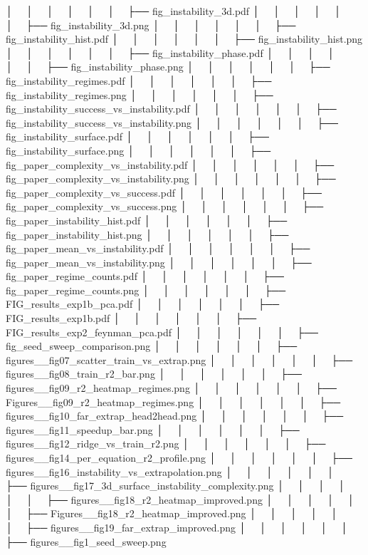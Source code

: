 │   │       │   │   │   │   ├── fig_instability_3d.pdf
│   │       │   │   │   │   ├── fig_instability_3d.png
│   │       │   │   │   │   ├── fig_instability_hist.pdf
│   │       │   │   │   │   ├── fig_instability_hist.png
│   │       │   │   │   │   ├── fig_instability_phase.pdf
│   │       │   │   │   │   ├── fig_instability_phase.png
│   │       │   │   │   │   ├── fig_instability_regimes.pdf
│   │       │   │   │   │   ├── fig_instability_regimes.png
│   │       │   │   │   │   ├── fig_instability_success_vs_instability.pdf
│   │       │   │   │   │   ├── fig_instability_success_vs_instability.png
│   │       │   │   │   │   ├── fig_instability_surface.pdf
│   │       │   │   │   │   ├── fig_instability_surface.png
│   │       │   │   │   │   ├── fig_paper_complexity_vs_instability.pdf
│   │       │   │   │   │   ├── fig_paper_complexity_vs_instability.png
│   │       │   │   │   │   ├── fig_paper_complexity_vs_success.pdf
│   │       │   │   │   │   ├── fig_paper_complexity_vs_success.png
│   │       │   │   │   │   ├── fig_paper_instability_hist.pdf
│   │       │   │   │   │   ├── fig_paper_instability_hist.png
│   │       │   │   │   │   ├── fig_paper_mean_vs_instability.pdf
│   │       │   │   │   │   ├── fig_paper_mean_vs_instability.png
│   │       │   │   │   │   ├── fig_paper_regime_counts.pdf
│   │       │   │   │   │   ├── fig_paper_regime_counts.png
│   │       │   │   │   │   ├── FIG_results_exp1b_pca.pdf
│   │       │   │   │   │   ├── FIG_results_exp1b.pdf
│   │       │   │   │   │   ├── FIG_results_exp2_feynman_pca.pdf
│   │       │   │   │   │   ├── fig_seed_sweep_comparison.png
│   │       │   │   │   │   ├── figures__fig07_scatter_train_vs_extrap.png
│   │       │   │   │   │   ├── figures__fig08_train_r2_bar.png
│   │       │   │   │   │   ├── figures__fig09_r2_heatmap_regimes.png
│   │       │   │   │   │   ├── Figures__fig09_r2_heatmap_regimes.png
│   │       │   │   │   │   ├── figures__fig10_far_extrap_head2head.png
│   │       │   │   │   │   ├── figures__fig11_speedup_bar.png
│   │       │   │   │   │   ├── figures__fig12_ridge_vs_train_r2.png
│   │       │   │   │   │   ├── figures__fig14_per_equation_r2_profile.png
│   │       │   │   │   │   ├── figures__fig16_instability_vs_extrapolation.png
│   │       │   │   │   │   ├── figures__fig17_3d_surface_instability_complexity.png
│   │       │   │   │   │   ├── figures__fig18_r2_heatmap_improved.png
│   │       │   │   │   │   ├── Figures__fig18_r2_heatmap_improved.png
│   │       │   │   │   │   ├── figures__fig19_far_extrap_improved.png
│   │       │   │   │   │   ├── figures__fig1_seed_sweep.png
